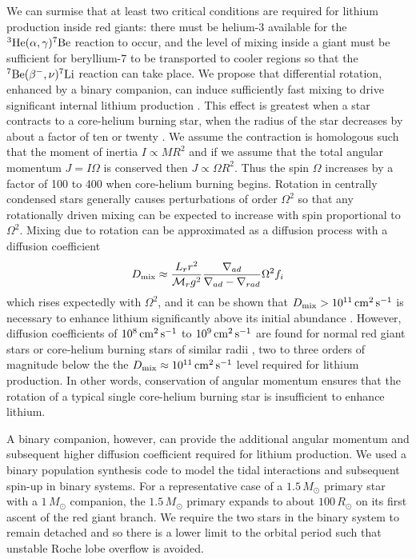 \documentclass[twocolumn]{aastex62}
\begin{document}
We can surmise that at least two critical conditions are required for lithium production inside red giants: there must be helium-3 available for the $^3{\rm He}(\alpha,\gamma)^7{\rm Be}$ reaction to occur, and the level of mixing inside a giant must be sufficient for beryllium-7 to be transported to cooler regions so that the $^7{\rm Be}(\beta^{-},\nu)^7{\rm Li}$ reaction can take place. We propose that differential rotation, enhanced by a binary companion, can induce sufficiently fast mixing to drive significant internal lithium production \citep{Costa_2002}. This effect is greatest when a star contracts to a core-helium burning star, when the radius of the star decreases by about a factor of ten or twenty \citep{Despain_1981}. We assume the contraction is homologous such that the moment of inertia  $I \propto MR^2$ and if we assume that the total angular momentum $J = I\Omega$ is conserved then $J \propto \Omega{}R^2$. Thus the spin $\Omega$ increases by a factor of 100 to 400 when core-helium burning begins. Rotation in centrally condensed stars \citep{Eddington_1929} generally causes perturbations of order $\Omega^2$ so that any rotationally driven mixing can be expected to increase with spin proportional to $\Omega^2$. 
Mixing due to rotation can be approximated as a diffusion process with a diffusion coefficient
\begin{equation}
D_{\rm mix} \approx \frac{L_{r}r^2}{\mathcal{M}_{r}g^{2}}\frac{\nabla_{ad}}{\nabla_{ad} - \nabla_{rad}}\Omega^2{f_i}
\end{equation}
\noindent{}which rises expectedly with $\Omega^2$, and it can be shown that $D_{\rm mix} > 10^{11}\,{\rm cm}^2\,{\rm s}^{-1}$ is necessary to enhance lithium significantly above its initial abundance \citep{Denissenkov_2004}. However, diffusion coefficients of $10^8\,{\rm cm}^2\,{\rm s}^{-1}$ to $10^9\,{\rm cm}^2\,{\rm s}^{-1}$ are found for normal red giant stars or core-helium burning stars of similar radii \citep{Denissenkov_2004,Palacios_2006}, two to three orders of magnitude below the the $D_{\rm mix} \approx 10^{11}\,{\rm cm}^2\,{\rm s}^{-1}$ level required for lithium production. 
In other words, conservation of angular momentum ensures that the rotation of a typical single core-helium burning star is insufficient to enhance lithium. 


A binary companion, however, can provide the additional angular momentum and subsequent higher
diffusion coefficient required for lithium production. We used a binary population 
synthesis code \citep{Hurley_2002} to model the tidal interactions and subsequent spin-up in binary systems.
For a representative case of a $1.5\,M_\odot$ primary star with a $1\,M_\odot$ companion,
the $1.5\,M_\odot$ primary expands to about $100\,R_\odot$ on its first 
ascent of the red giant branch. We require the two stars in the binary system 
to remain detached and so there
is a lower limit to the orbital period such that unstable Roche lobe overflow is avoided.
\end{document}

